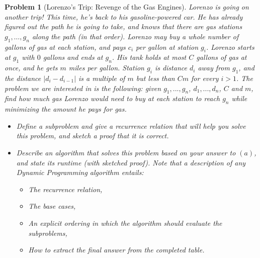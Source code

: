 \documentclass[10pt]{article}
\newtheorem{problem}{\sc\color{cit}Problem}
\begin{document}
\begin{problem}[Lorenzo's Trip: Revenge of the Gas Engines]
Lorenzo is going on another trip! This time, he's back to his gasoline-powered car. He has already figured out the path he is going to take, and knows that there are gas stations $g_1,\ldots, g_n$ along the path (in that order). Lorenzo may buy a whole number of gallons of gas at each station, and pays $c_i$ per gallon at station $g_i$. Lorenzo starts at $g_1$ with $0$ gallons and ends at $g_n$. His tank holds at most $C$ gallons of gas at once, and he gets $m$ miles per gallon. Station $g_i$ is distance $d_i$ away from $g_1$, and the distance $|d_i - d_{i-1}|$ is a multiple of $m$ but less than $Cm$ for every $i>1$. The problem we are interested in is the following: given $g_1,... , g_n$, $d_1, ..., d_n$, $C$ and $m$, find how much gas Lorenzo would need to buy at each station to reach $g_n$ while minimizing the amount he pays for gas.

\begin{itemize}
    \item[(a)] Define a subproblem and give a recurrence relation that will help you solve this problem, and sketch a proof that it is correct.
    \item[(b)] Describe an algorithm that solves this problem based on your answer to $(a)$, and state its runtime (with sketched proof). Note that a description of any Dynamic Programming algorithm entails:
    \begin{itemize}
        \item The recurrence relation,
        \item The base cases,
        \item An explicit ordering in which the algorithm should evaluate the subproblems,
        \item How to extract the final answer from the completed table.
    \end{itemize}
\end{itemize}
\end{problem}
\end{document}
